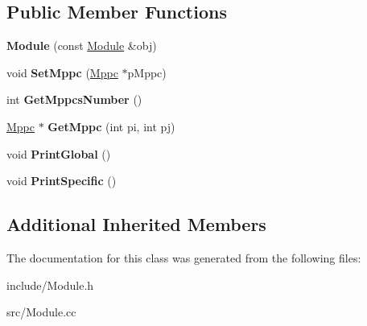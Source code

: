 \subsection*{Public Member Functions}
\begin{DoxyCompactItemize}
\item 
\hypertarget{classModule_a0b67e6a01ed05b519f53a071f02f0fed}{{\bfseries Module} (const \hyperlink{classModule}{Module} \&obj)}\label{classModule_a0b67e6a01ed05b519f53a071f02f0fed}

\item 
\hypertarget{classModule_a1cbfcfa25abd8fd7cd1054ef71e8e115}{void {\bfseries Set\+Mppc} (\hyperlink{classMppc}{Mppc} $\ast$p\+Mppc)}\label{classModule_a1cbfcfa25abd8fd7cd1054ef71e8e115}

\item 
\hypertarget{classModule_a274245fd0e6f56c534748d7f6186a08f}{int {\bfseries Get\+Mppcs\+Number} ()}\label{classModule_a274245fd0e6f56c534748d7f6186a08f}

\item 
\hypertarget{classModule_ac898a09f44040eccedbf89bde29e4d2b}{\hyperlink{classMppc}{Mppc} $\ast$ {\bfseries Get\+Mppc} (int pi, int pj)}\label{classModule_ac898a09f44040eccedbf89bde29e4d2b}

\item 
\hypertarget{classModule_a16ed7ea902b71f00be9c198da93b5d54}{void {\bfseries Print\+Global} ()}\label{classModule_a16ed7ea902b71f00be9c198da93b5d54}

\item 
\hypertarget{classModule_af48d2b96b740b2bce1c4435f089ed515}{void {\bfseries Print\+Specific} ()}\label{classModule_af48d2b96b740b2bce1c4435f089ed515}

\end{DoxyCompactItemize}
\subsection*{Additional Inherited Members}


The documentation for this class was generated from the following files\+:\begin{DoxyCompactItemize}
\item 
include/Module.\+h\item 
src/Module.\+cc\end{DoxyCompactItemize}

